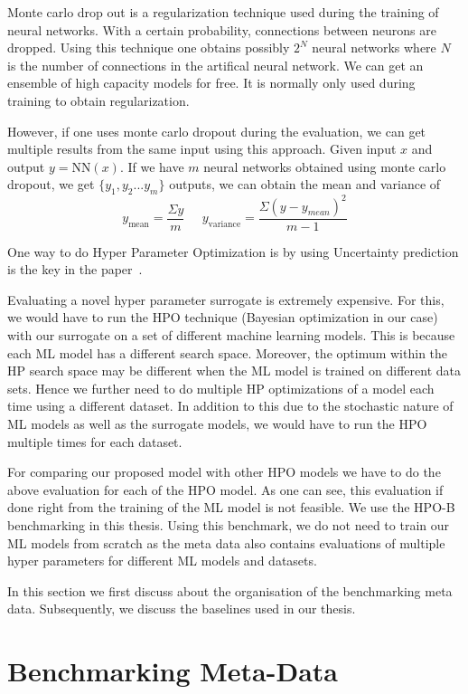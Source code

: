 \documentclass[11pt]{report}
\begin{document}
Monte carlo drop out is a regularization technique used during the training of neural networks.
With a certain probability,  connections between neurons are dropped.
Using this technique one obtains possibly $2^N$ neural networks where $N$ is the number of connections
in the artifical neural network.
We can get an ensemble of high capacity models for free.
It is normally only used during training to obtain regularization.

However,  if one uses monte carlo dropout during the evaluation,  we can get multiple results from the same input using this approach.
Given input $x$ and output $y = \textrm{NN}(x)$.  If we have $m$ neural networks obtained using monte carlo dropout,  we get $\{y_1, y_2... y_m\}$ outputs,  we can obtain the mean and variance of 
$$
y_\textrm{mean} = \frac{\Sigma y}{m}  \;\;\;\;\;  y_\textrm{variance} =\frac{\Sigma(y - y_{mean})^2}{m-1}
$$


One way to do Hyper Parameter Optimization is by using 
Uncertainty prediction is the key in the paper~\cite{DeepEnsemblePaper}.

Evaluating a novel hyper parameter surrogate is extremely expensive.
For this,  we would have to run the HPO technique (Bayesian optimization in our case) with our surrogate on a set of different machine learning models.
This is because each ML model has a different search space.
Moreover,  the optimum within the HP search space may be different when the ML model is trained on different data sets.
Hence we further need to do multiple HP optimizations of a model each time using a different dataset.
In addition to this due to the stochastic nature of ML models as well as the surrogate models, 
we would have to run the HPO multiple times for each dataset.

For comparing our proposed model with other HPO models we have to do the above evaluation for each of the HPO model.
As one can see,  this evaluation if done right from the training of the ML model is not feasible.
We use the HPO-B~\cite{DBLP:journals/corr/abs-2106-06257} benchmarking in this thesis.
Using this benchmark,  we do not need to train our ML models from scratch as the meta data also contains evaluations of multiple hyper parameters for different ML models and datasets.


In this section we first discuss about the organisation of the benchmarking meta data.
Subsequently, we discuss the baselines used in our thesis.


\section{Benchmarking Meta-Data}
\end{document}
